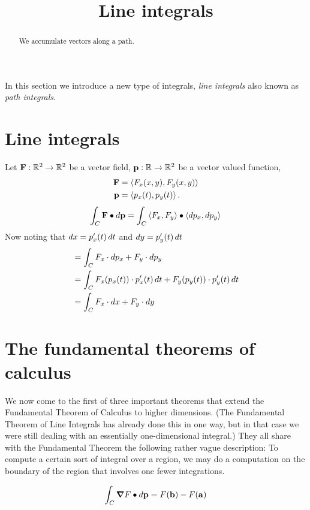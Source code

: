 \documentclass{ximera}
\title[Dig-In:]{Line integrals}
\begin{document}
\begin{abstract}
We accumulate vectors along a path.
\end{abstract}
\maketitle

In this section we introduce a new type of integrals, \textit{line integrals} also known as \textit{path integrals}.

\section{Line integrals}

\begin{definition}
Let $\mathbf{F}:\mathbb R^2\to\mathbb R^2$ be a vector field, $\mathbf{p}:\mathbb R\to\mathbb R^2$ be a
vector valued function,
\begin{align*}
  \mathbf{F} &= \left\langle F_x(x,y), F_y(x,y)\right\rangle\\
  \mathbf{p} &= \left\langle p_x(t),p_y(t)\right\rangle.
\end{align*}
\[
\int_C \mathbf{F}\bullet \mathop{}\!d \mathbf{p} = \int_C \left\langle F_x,F_y\right\rangle\bullet\left\langle \mathop{}\!d p_x,\mathop{}\!d p_y\right\rangle
\]
Now noting that $\mathop{}\!d x = p_x'(t)\mathop{}\!d t$ and $\mathop{}\!d y = p_y'(t)\mathop{}\!d t$  
\begin{align*}
  &= \int_C F_x\cdot \mathop{}\!d p_x + F_y\cdot \mathop{}\!d p_y\\
  &= \int_C F_x(p_x(t))\cdot p'_x(t) \mathop{}\!d t + F_y(p_y(t))\cdot  p'_y(t) \mathop{}\!d t\\
  &= \int_C F_x\cdot \mathop{}\!d x  + F_y\cdot  \mathop{}\!d y
\end{align*}
\end{definition}



\section{The fundamental theorems of calculus}



We now come to the first of three important theorems that extend the
Fundamental Theorem of Calculus to higher dimensions. (The Fundamental
Theorem of Line Integrals has already done this in one way, but in
that case we were still dealing with an essentially one-dimensional
integral.) They all share with the Fundamental Theorem the following
rather vague description: To compute a certain sort of integral over a
region, we may do a computation on the boundary of the region that
involves one fewer integrations.



\[
\int_C \boldsymbol\nabla F\bullet \mathop{}\!d \mathbf{p} = F(\mathbf{b}) - F(\mathbf{a})
\]
\end{document}
